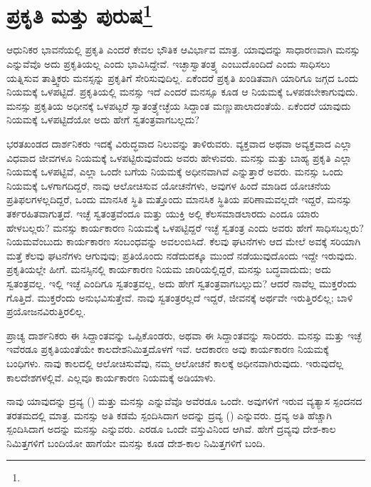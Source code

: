 
\chapter[ಪ್ರಕೃತಿ ಮತ್ತು ಪುರುಷ]{ಪ್ರಕೃತಿ ಮತ್ತು ಪುರುಷ\protect\footnote{}}

ಆಧುನಿಕರ ಭಾವನೆಯಲ್ಲಿ ಪ್ರಕೃತಿ ಎಂದರೆ ಕೇವಲ ಭೌತಿಕ ಆವಿರ್ಭಾವ ಮಾತ್ರ. ಯಾವುದನ್ನು ಸಾಧಾರಣವಾಗಿ ಮನಸ್ಸು ಎನ್ನುವೆವೊ ಅದು ಪ್ರಕೃತಿಯಲ್ಲ ಎಂದು ಭಾವಿಸಿದ್ದೇವೆ. ಇಚ್ಛಾಸ್ವಾತಂತ್ರ್ಯ ಎಂಬುದೊಂದಿದೆ ಎಂದು ಸಾಧಿಸಲು ಯತ್ನಿಸುವ ತಾತ್ತ್ವಿಕರು ಮನಸ್ಸನ್ನು ಪ್ರಕೃತಿಗೆ ಸೇರಿಸುವುದಿಲ್ಲ. ಏಕೆಂದರೆ ಪ್ರಕೃತಿ ಖಂಡಿತವಾಗಿ ಯಾರಿಗೂ ಜಗ್ಗದ ಒಂದು ನಿಯಮಕ್ಕೆ ಒಳಪಟ್ಟಿದೆ. ಪ್ರಕೃತಿಯಲ್ಲಿ ಮನಸ್ಸು ಇದೆ ಎಂದರೆ ಮನಸ್ಸೂ ಕೂಡ ಆ ನಿಯಮಕ್ಕೆ ಒಳಪಡಬೇಕಾಗುವುದು. ಮನಸ್ಸು ಪ್ರಕೃತಿಯ ಅಧೀನಕ್ಕೆ ಒಳಪಟ್ಟರೆ ಸ್ವಾತಂತ್ರ್ಯೇಚ್ಛೆಯ ಸಿದ್ದಾಂತ ಮಣ್ಣುಪಾಲಾದಂತೆಯೆ. ಏಕೆಂದರೆ ಯಾವುದು ನಿಯಮಕ್ಕೆ ಒಳಪಟ್ಟಿದೆಯೋ ಅದು ಹೇಗೆ ಸ್ವತಂತ್ರವಾಗಬಲ್ಲದು?

ಭರತಖಂಡದ ದಾರ್ಶನಿಕರು ಇದಕ್ಕೆ ವಿರುದ್ಧವಾದ ನಿಲುವನ್ನು ತಾಳಿರುವರು. ವ್ಯಕ್ತವಾದ ಅಥವಾ ಅವ್ಯಕ್ತವಾದ ಎಲ್ಲಾ ವಿಧವಾದ ಜೀವಗಳೂ ನಿಯಮಕ್ಕೆ ಒಳಪಟ್ಟಿರುವುವೆಂದು ಅವರು ಹೇಳುವರು. ಮನಸ್ಸು ಮತ್ತು ಬಾಹ್ಯ ಪ್ರಕೃತಿ ಎಲ್ಲಾ ನಿಯಮಕ್ಕೆ ಒಳಪಟ್ಟಿವೆ, ಎಲ್ಲಾ ಒಂದೇ ಬಗೆಯ ನಿಯಮಕ್ಕೆ ಅಧೀನವಾಗಿವೆ ಎನ್ನುತ್ತಾರೆ ಅವರು. ಮನಸ್ಸು ಒಂದು ನಿಯಮಕ್ಕೆ ಒಳಗಾಗದಿದ್ದರೆ, ನಾವು ಆಲೋಚಿಸುವ ಯೋಚನೆಗಳು, ಅವುಗಳ ಹಿಂದೆ ಮಾಡಿದ ಯೋಚನೆಯ ಪ್ರತಿಫಲಗಳಲ್ಲದಿದ್ದರೆ, ಒಂದು ಮಾನಸಿಕ ಸ್ಥಿತಿ ಮತ್ತೊಂದು ಮಾನಸಿಕ ಸ್ಥಿತಿಯ ಪರಿಣಾಮವಲ್ಲದೇ ಇದ್ದರೆ, ಮನಸ್ಸು ತರ್ಕರಹಿತವಾಗುತ್ತದೆ. ಇಚ್ಛೆ ಸ್ವತಂತ್ರವೆಂದೂ ಮತ್ತು ಯುಕ್ತಿ ಅಲ್ಲಿ ಕೆಲಸಮಾಡಲಾರದು ಎಂದೂ ಯಾರು ಹೇಳಬಲ್ಲರು? ಮನಸ್ಸು ಕಾರ್ಯಕಾರಣ ನಿಯಮಕ್ಕೆ ಒಳಪಟ್ಟಿದ್ದರೆ ಇಚ್ಛೆ ಸ್ವತಂತ್ರ ಎಂದು ಅವರು ಹೇಗೆ ಸಾಧಿಸಬಲ್ಲರು? ನಿಯಮವೆಂಬುದು ಕಾರ್ಯಕಾರಣ ಸಂಬಂಧವನ್ನು ಅವಲಂಬಿಸಿದೆ. ಕೆಲವು ಘಟನೆಗಳು ಆದ ಮೇಲೆ ಅವಕ್ಕೆ ಸರಿಯಾಗಿ ಮತ್ತೆ ಕೆಲವು ಘಟನೆಗಳು ಆಗುವುವು; ಪ್ರತಿಯೊಂದು ನಡೆದುದಕ್ಕೂ ಮುಂದೆ ನಡೆಯುವುದೊಂದು ಇದ್ದೇ ಇರುವುದು. ಪ್ರಕೃತಿಯಲ್ಲೇ ಹೀಗೆ. ಮನಸ್ಸಿನಲ್ಲಿ ಕಾರ್ಯಕಾರಣ ನಿಯಮ ಜಾರಿಯಲ್ಲಿದ್ದರೆ, ಮನಸ್ಸು ಬದ್ಧವಾದುದು; ಅದು ಸ್ವತಂತ್ರವಲ್ಲ. ಇಲ್ಲಿ ಇಚ್ಛೆ ಎಂದಿಗೂ ಸ್ವತಂತ್ರವಲ್ಲ, ಅದು ಹೇಗೆ ಸ್ವತಂತ್ರವಾಗಬಲ್ಲುದು? ಆದರೆ ನಾವೆಲ್ಲ ಮುಕ್ತರೆಂದು ಗೊತ್ತಿದೆ. ಮುಕ್ತರೆಂದು ಅನುಭವಿಸುತ್ತೇವೆ. ನಾವು ಸ್ವತಂತ್ರರಲ್ಲದೆ ಇದ್ದರೆ, ಜೀವನಕ್ಕೆ ಅರ್ಥವೇ ಇರುತ್ತಿರಲಿಲ್ಲ; ಬಾಳಿ ಪ್ರಯೋಜನವಿರುತ್ತಿರಲಿಲ್ಲ.

ಪ್ರಾಚ್ಯ ದಾರ್ಶನಿಕರು ಈ ಸಿದ್ದಾಂತವನ್ನು ಒಪ್ಪಿಕೊಂಡರು, ಅಥವಾ ಈ ಸಿದ್ದಾಂತವನ್ನು ಸಾರಿದರು. ಮನಸ್ಸು ಮತ್ತು ಇಚ್ಛೆ ಇವೆರಡೂ ಪ್ರಕೃತಿಯಂತೆಯೇ ಕಾಲದೇಶನಿಮಿತ್ತದೊಳಗೆ ಇವೆ. ಆದಕಾರಣ ಅವು ಕಾರ್ಯಕಾರಣ ನಿಯಮಕ್ಕೆ ಬಂಧಿಗಳು. ನಾವು ಕಾಲದಲ್ಲಿ ಆಲೋಚಿಸುವೆವು, ನಮ್ಮ ಆಲೋಚನೆ ಕಾಲಕ್ಕೆ ಅಧೀನವಾಗಿರುವುದು. ಇರುವುದೆಲ್ಲ ಕಾಲದೇಶಗಳಲ್ಲಿವೆ. ಎಲ್ಲವೂ ಕಾರ್ಯಕಾರಣ ನಿಯಮಕ್ಕೆ ಅಡಿಯಾಳು.

ನಾವು ಯಾವುದನ್ನು ದ್ರವ್ಯ () ಮತ್ತು ಮನಸ್ಸು ಎನ್ನುವೆವೊ ಅವೆರಡೂ ಒಂದೇ. ಅವುಗಳಿಗೆ ಇರುವ ವ್ಯತ್ಯಾಸ ಸ್ಪಂದನದ ತರತಮದಲ್ಲಿ ಮಾತ್ರ. ಮನಸ್ಸು ಅತಿ ಕಡಮೆ ಸ್ಪಂದಿಸಿದಾಗ ಅದನ್ನು ದ್ರವ್ಯ () ಎನ್ನುವರು. ದ್ರವ್ಯ ಅತಿ ಹೆಚ್ಚಾಗಿ ಸ್ಪಂದಿಸಿದಾಗ ಅದನ್ನು ಮನಸ್ಸು ಎನ್ನುವರು. ಎರಡೂ ಒಂದೇ ವಸ್ತುವಿನಿಂದ ಆಗಿವೆ. ಹೇಗೆ ದ್ರವ್ಯವು ದೇಶ-ಕಾಲ ನಿಮಿತ್ತಗಳಿಗೆ ಬಂದಿಯೋ ಹಾಗೆಯೇ ಮನಸ್ಸು ಕೂಡ ದೇಶ-ಕಾಲ ನಿಮಿತ್ತಗಳಿಗೆ ಬಂದಿ.


